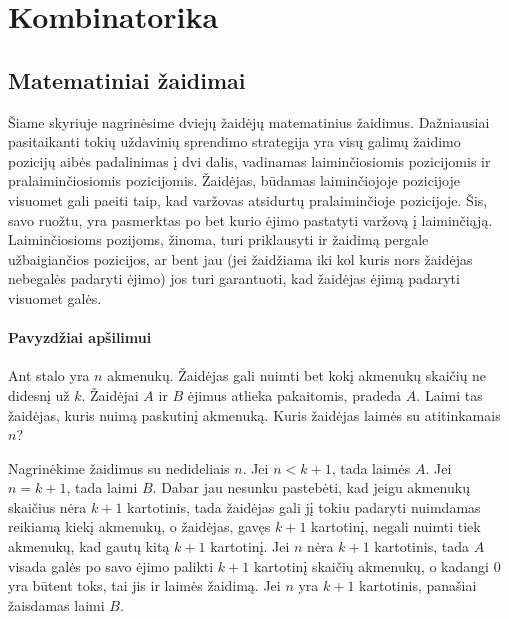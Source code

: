 \chapter{Kombinatorika}
\thispagestyle{empty}

\section{Matematiniai žaidimai}

Šiame skyriuje nagrinėsime dviejų žaidėjų matematinius žaidimus.
Dažniausiai pasitaikanti tokių uždavinių sprendimo strategija yra visų
galimų žaidimo pozicijų aibės padalinimas į dvi dalis, vadinamas laiminčiosiomis
pozicijomis ir pralaiminčiosiomis pozicijomis. Žaidėjas, būdamas
laiminčiojoje pozicijoje visuomet gali paeiti taip, kad varžovas atsidurtų
pralaiminčioje pozicijoje. Šis, savo ruožtu, yra pasmerktas po bet kurio
ėjimo pastatyti varžovą į laiminčiąją. Laiminčiosioms pozijoms, žinoma,
turi priklausyti ir žaidimą pergale užbaigiančios pozicijos, ar bent jau (jei
žaidžiama iki kol kuris nors žaidėjas nebegalės padaryti ėjimo) jos turi
garantuoti, kad žaidėjas ėjimą padaryti visuomet galės. 


\subsubsection{Pavyzdžiai apšilimui}

\begin{pavnr}
  Ant stalo yra $n$ akmenukų. Žaidėjas gali nuimti bet kokį akmenukų skaičių
  ne didesnį už $k$. Žaidėjai $A$ ir $B$ ėjimus atlieka pakaitomis, pradeda $A$.
  Laimi tas žaidėjas, kuris nuimą paskutinį akmenuką. Kuris žaidėjas laimės
  su atitinkamais $n$?
  \label{n/kakmenukų}
\end{pavnr}

\begin{sprendimas}
  Nagrinėkime žaidimus su nedideliais $n$. Jei  $n<k+1$, tada laimės $A$. Jei $n =
  k+1$, tada laimi $B$. Dabar jau nesunku pastebėti, kad jeigu akmenukų skaičius
  nėra $k+1$ kartotinis, tada žaidėjas gali jį tokiu padaryti nuimdamas
  reikiamą kiekį akmenukų, o žaidėjas, gavęs  $k+1$ kartotinį, negali nuimti
  tiek akmenukų, kad gautų kitą $k+1$ kartotinį. Jei $n$ nėra $k+1$
  kartotinis, tada $A$ visada galės po savo ėjimo palikti $k+1$ kartotinį
  skaičių akmenukų, o kadangi $0$ yra būtent toks, tai jis ir laimės žaidimą.
  Jei $n$ yra $k+1$ kartotinis, panašiai žaisdamas laimi $B$. 
\end{sprendimas}

